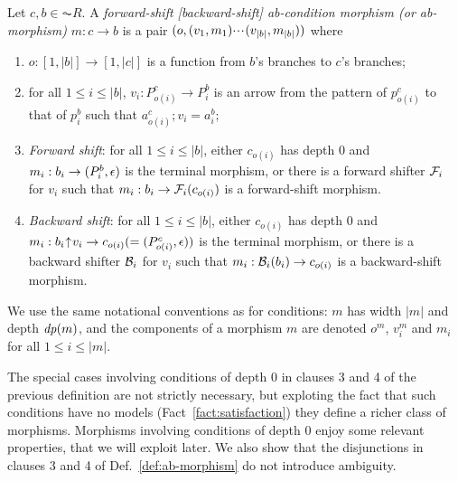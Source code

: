 \begin{definition}\label{def:ab-morphism}
  Let $c,b \in \AC{R}$. A \emph{forward-shift [backward-shift] ab-condition morphism (or ab-morphism)} $m: c \to b$ is a pair $(o,(v_1,m_1){\cdotp\mkern-2mu\cdotp\mkern-2mu\cdotp\mkern1mu} (v_{|b|},m_{|b|}))$ where
  \begin{enumerate}[topsep=\smallskipamount]
  \item $o:[1,|b|]\to[1,|c|]$ is a function from $b$'s branches to $c$'s branches; 
  \item for all $1\leq i\leq |b|$, $v_i:P^c_{o(i)}\to P^b_i$ is an arrow from the pattern of $p^c_{o(i)}$ to that of $p^b_i$ such that $a^c_{o(i)};v_i=a^b_i$;
  \item\emph{Forward shift}: for all $1\leq i\leq |b|$, either $c_{o(i)}$ has depth 0 and 
  $m_i: b_i \rightarrow (P^b_i,\epsilon)$ is the  
  terminal
  morphism, 
  or there is a forward  shifter $\mathcal{F}_i$ for $v_i$ such that $m_i:b_i \rightarrow \mathcal{F}_i(c_{o(i)})$ is a forward-shift morphism.
  \item\emph{Backward shift}: for all $1\leq i\leq |b|$, either $c_{o(i)}$ has depth 0 and 
  $m_i: {b_i}{\mskip1mu\uparrow\mskip1mu}{v_i} \rightarrow c_{o(i)} (= (P^c_{o(i)},\epsilon))$ is the 
  terminal 
  morphism,
  or there is a backward  shifter $\mathcal{B}_i$ for $v_i$ such that $m_i:\mathcal{B}_i(b_i) \rightarrow c_{o(i)}$ is a backward-shift morphism.
  \end{enumerate}
\end{definition}
We use the same notational conventions as for conditions: $m$ has width $|m|$ and depth $\mathit{dp}(m)$, and the components of a morphism $m$ are denoted $o^m$, $v^m_i$ and $m_i$ for all $1\leq i\leq |m|$. 

The special cases involving conditions of depth 0 in clauses 3 and 4 of the previous definition are not strictly necessary, but exploting the fact that such conditions have no models (Fact~\ref{fact:satisfaction}) they define a richer class of morphisms.
Morphisms involving conditions of depth 0 enjoy some relevant properties, that we will exploit later. We also show that the disjunctions in clauses 3 and 4 of Def.~\ref{def:ab-morphism} do not introduce ambiguity. 

